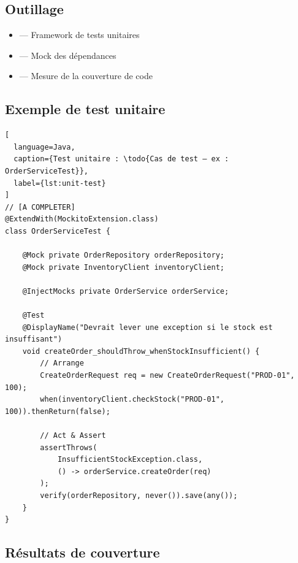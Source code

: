 \subsection{Outillage}

\begin{itemize}
  \item {} — Framework de tests unitaires
  \item {} — Mock des dépendances
  \item {} — Mesure de la couverture de code
\end{itemize}

\subsection{Exemple de test unitaire}

\begin{lstlisting}[
  language=Java,
  caption={Test unitaire : \todo{Cas de test — ex : OrderServiceTest}},
  label={lst:unit-test}
]
// [A COMPLETER]
@ExtendWith(MockitoExtension.class)
class OrderServiceTest {

    @Mock private OrderRepository orderRepository;
    @Mock private InventoryClient inventoryClient;

    @InjectMocks private OrderService orderService;

    @Test
    @DisplayName("Devrait lever une exception si le stock est insuffisant")
    void createOrder_shouldThrow_whenStockInsufficient() {
        // Arrange
        CreateOrderRequest req = new CreateOrderRequest("PROD-01", 100);
        when(inventoryClient.checkStock("PROD-01", 100)).thenReturn(false);

        // Act & Assert
        assertThrows(
            InsufficientStockException.class,
            () -> orderService.createOrder(req)
        );
        verify(orderRepository, never()).save(any());
    }
}
\end{lstlisting}

\subsection{Résultats de couverture}

